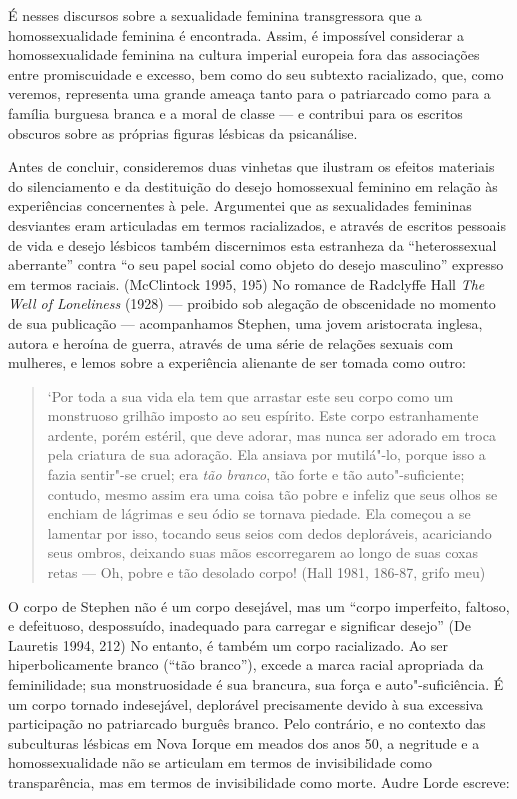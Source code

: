 É nesses discursos sobre a sexualidade feminina transgressora que a
homossexualidade feminina é encontrada. Assim, é impossível considerar a
homossexualidade feminina na cultura imperial europeia fora das
associações entre promiscuidade e excesso, bem como do seu subtexto
racializado, que, como veremos, representa uma grande ameaça tanto para
o patriarcado como para a família burguesa branca e a moral de classe ---
e contribui para os escritos obscuros sobre as próprias figuras lésbicas
da psicanálise.

Antes de concluir, consideremos duas vinhetas que ilustram os efeitos
materiais do silenciamento e da destituição do desejo homossexual
feminino em relação às experiências concernentes à pele. Argumentei que
as sexualidades femininas desviantes eram articuladas em termos
racializados, e através de escritos pessoais de vida e desejo lésbicos
também discernimos esta estranheza da ``heterossexual aberrante'' contra
``o seu papel social como objeto do desejo masculino'' expresso em termos
raciais. (McClintock 1995, 195) No romance de Radclyffe Hall \emph{The
Well of Loneliness} (1928) --- proibido sob alegação de obscenidade no
momento de sua publicação --- acompanhamos Stephen, uma jovem aristocrata
inglesa, autora e heroína de guerra, através de uma série de relações
sexuais com mulheres, e lemos sobre a experiência alienante de ser
tomada como outro:

\begin{quote}
`Por toda a sua vida ela tem que arrastar este seu corpo como um
monstruoso grilhão imposto ao seu espírito. Este corpo estranhamente
ardente, porém estéril, que deve adorar, mas nunca ser adorado em troca
pela criatura de sua adoração. Ela ansiava por mutilá"-lo, porque isso a
fazia sentir"-se cruel; era \emph{tão branco}, tão forte e tão
auto"-suficiente; contudo, mesmo assim era uma coisa tão pobre e infeliz
que seus olhos se enchiam de lágrimas e seu ódio se tornava piedade. Ela
começou a se lamentar por isso, tocando seus seios com dedos
deploráveis, acariciando seus ombros, deixando suas mãos escorregarem ao
longo de suas coxas retas --- Oh, pobre e tão desolado corpo! (Hall 1981,
186-87, grifo meu)
\end{quote}

O corpo de Stephen não é um corpo desejável, mas um ``corpo imperfeito,
faltoso, e defeituoso, despossuído, inadequado para carregar e
significar desejo'' (De Lauretis 1994, 212) No entanto, é também um
corpo racializado. Ao ser hiperbolicamente branco (``tão branco''), excede
a marca racial apropriada da feminilidade; sua monstruosidade é sua
brancura, sua força e auto"-suficiência. É um corpo tornado indesejável,
deplorável precisamente devido à sua excessiva participação no
patriarcado burguês branco. Pelo contrário, e no contexto das
subculturas lésbicas em Nova Iorque em meados dos anos 50, a negritude e
a homossexualidade não se articulam em termos de invisibilidade como
transparência, mas em termos de invisibilidade como morte. Audre Lorde
escreve:

